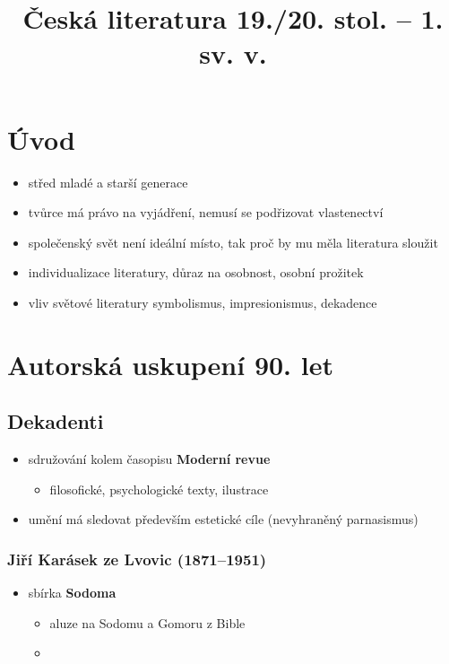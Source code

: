 \title{Česká literatura 19./20. stol. -- 1. sv. v.}


\section{Úvod}
\begin{itemize}
\item střed mladé a starší generace
\item tvůrce má právo na vyjádření, nemusí se podřizovat vlastenectví
\item společenský svět není ideální místo, tak proč by mu měla literatura sloužit
\item[\ra] individualizace literatury, důraz na osobnost, osobní prožitek 
\item vliv světové literatury \ra symbolismus, impresionismus, dekadence
\end{itemize}

\section{Autorská uskupení 90. let}
\subsection{Dekadenti}
\begin{itemize}
\item sdružování kolem časopisu \textbf{Moderní revue}
	\begin{itemize}
	\item filosofické, psychologické texty, ilustrace
	\end{itemize}
\item umění má sledovat především estetické cíle (nevyhraněný parnasismus)
\end{itemize}

\subsubsection{Jiří Karásek ze Lvovic (1871--1951)}
\begin{itemize}
\item sbírka \textbf{Sodoma}
	\begin{itemize}
	\item aluze na Sodomu a Gomoru z Bible
	\item 
	\end{itemize}
\end{itemize}


